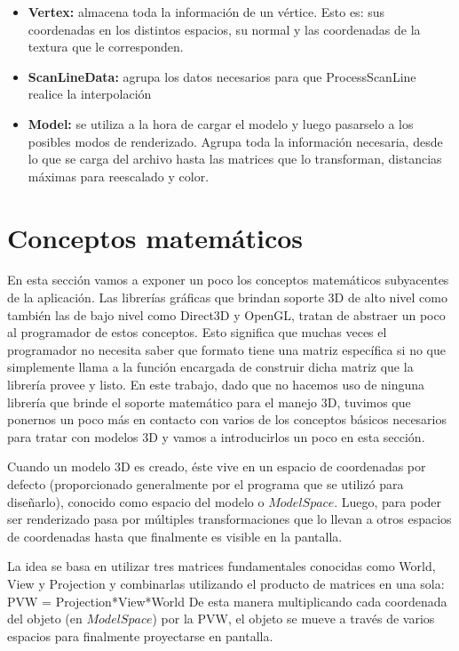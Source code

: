 \documentclass[a4paper]{article}
\newcounter{col}
\begin{document}
\begin{itemize}
\item \textbf{Vertex: } almacena toda la información de un vértice. Esto es: sus coordenadas en los distintos espacios, su normal y las coordenadas de la textura que le corresponden.
\item \textbf{ScanLineData:} agrupa los datos necesarios para que ProcessScanLine realice la interpolación
\item \textbf{Model:} se utiliza a la hora de cargar el modelo y luego pasarselo a los posibles modos de renderizado. Agrupa toda la información necesaria, desde lo que se carga del archivo hasta las matrices que lo transforman, distancias máximas para reescalado y color.
\end{itemize}
 
\section{Conceptos matemáticos} \label{conceptos}

En esta sección vamos a exponer un poco los conceptos matemáticos subyacentes de la aplicación. Las librerías gráficas que brindan soporte 3D de alto nivel como también las de bajo nivel como Direct3D y OpenGL, tratan de abstraer un poco al programador de estos conceptos. Esto significa que muchas veces el programador no necesita saber que formato tiene una matriz específica si no que simplemente llama a la función encargada de construir dicha matriz que la librería provee y listo. En este trabajo, dado que no hacemos uso de ninguna librería que brinde el soporte matemático para el manejo 3D, tuvimos que ponernos un poco más en contacto con varios de los conceptos básicos necesarios para tratar con modelos 3D y vamos a introducirlos un poco en esta sección.

\par Cuando un modelo 3D es creado, éste vive en un espacio de coordenadas por defecto (proporcionado generalmente por el programa que se utilizó para diseñarlo), conocido como espacio del modelo o $Model Space$. Luego, para poder ser renderizado pasa por múltiples transformaciones que lo llevan a otros espacios de coordenadas hasta que finalmente es visible en la pantalla. 
\par La idea se basa en utilizar tres matrices fundamentales conocidas como World, View y Projection y combinarlas utilizando el producto de matrices en una sola: 
PVW = Projection*View*World
De esta manera  multiplicando cada coordenada del objeto (en $Model Space$) por la PVW, el objeto se mueve a través de varios espacios para finalmente proyectarse en pantalla.
\end{document}
